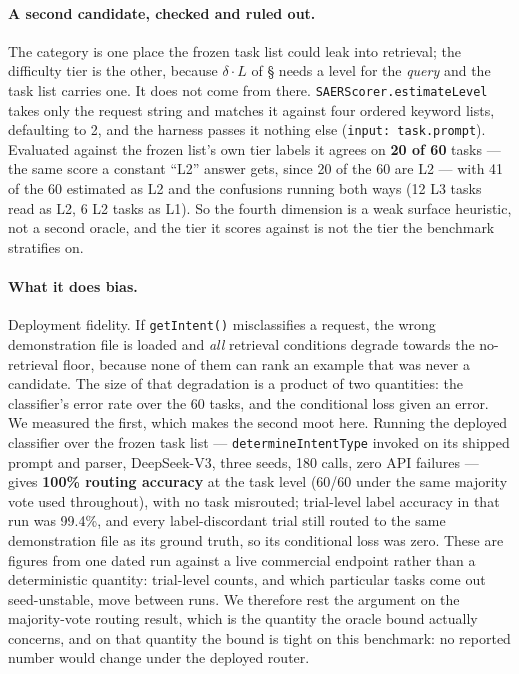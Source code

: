 \documentclass[letterpaper]{article} %
\newcommand{\bodyref}[1]{\getrefnumber{#1}}
\begin{document}
\paragraph{A second candidate, checked and ruled out.}  The category is one
place the frozen task list could leak into retrieval; the difficulty tier is
the other, because $\delta{\cdot}L$ of \S\bodyref{sec:scoring} needs a level for
the \emph{query} and the task list carries one.  It does not come from there.
\texttt{SAERScorer.estimateLevel} takes only the request string and matches it
against four ordered keyword lists, defaulting to 2, and the harness passes it
nothing else (\texttt{input: task.prompt}).  Evaluated against the frozen
list's own tier labels it agrees on \textbf{20 of 60} tasks --- the same score
a constant ``L2'' answer gets, since 20 of the 60 are L2 --- with 41 of the 60
estimated as L2 and the confusions running both ways (12 L3 tasks read as L2,
6 L2 tasks as L1).  So the fourth dimension is a weak surface heuristic, not a
second oracle, and the tier it scores against is not the tier the benchmark
stratifies on.

\paragraph{What it does bias.}  Deployment fidelity.  If
\texttt{getIntent()} misclassifies a request, the wrong demonstration
file is loaded and \emph{all} retrieval conditions degrade towards the
no-retrieval floor, because none of them can rank an example that was
never a candidate.  The size of that degradation is a product of two
quantities: the classifier's error rate over the 60 tasks, and the
conditional loss given an error.  We measured the first, which makes the
second moot here.  Running the deployed classifier over the frozen task
list --- \texttt{determineIntentType} invoked on its shipped prompt and
parser, DeepSeek-V3, three seeds, 180 calls, zero API failures --- gives
\textbf{100\% routing accuracy} at the task level (60/60 under the same
majority vote used throughout), with no task misrouted; trial-level
label accuracy in that run was 99.4\%, and every label-discordant trial
still routed to the same demonstration file as its ground truth, so its
conditional loss was zero.  These are figures from one dated run against
a live commercial endpoint rather than a deterministic quantity:
trial-level counts, and which particular tasks come out seed-unstable,
move between runs.  We therefore rest the argument on the majority-vote
routing result, which is the quantity the oracle bound actually
concerns, and on that quantity the bound is tight on this benchmark: no
reported number would change under the deployed router.
\end{document}
